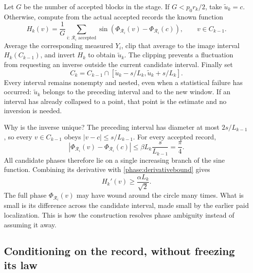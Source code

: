 \documentclass[11pt,a4paper]{article}
\numberwithin{equation}{section}
\theoremstyle{remark}
\begin{document}
Let $G$ be the number of accepted blocks in the stage.  If
$G<p_0r_k/2$, take $\widetilde u_k=c$.  Otherwise, compute from the actual
accepted records the known function
\begin{equation}
 H_k(v)=\frac1G\sum_{i:\,\mathcal R_i\text{ accepted}}
 \sin(\Phi_{\mathcal R_i}(v)-\Phi_{\mathcal R_i}(c)),
 \qquad v\in C_{k-1}.
 \label{phase:responsecurve}
\end{equation}
Average the corresponding measured $Y_i$, clip that average to the image
interval $H_k(C_{k-1})$, and invert $H_k$ to obtain $\widetilde u_k$.  The
clipping prevents a fluctuation from requesting an inverse outside the
current candidate interval.  Finally set
\begin{equation}
 C_k=C_{k-1}\cap
 [\widetilde u_k-s/L_k,\widetilde u_k+s/L_k].
 \label{phase:nesting}
\end{equation}
Every interval remains nonempty and nested, even when a statistical failure
has occurred: $\widetilde u_k$ belongs to the preceding interval and to the
new window.  If an interval has already collapsed to a point, that point is
the estimate and no inversion is needed.

Why is the inverse unique?  The preceding interval has diameter at most
$2s/L_{k-1}$, so every $v\in C_{k-1}$ obeys $|v-c|\le s/L_{k-1}$.
For every accepted record,
\begin{equation}
 |\Phi_{\mathcal R_i}(v)-\Phi_{\mathcal R_i}(c)|
 \le\beta L_k\frac{s}{L_{k-1}}=\frac\pi4.
 \label{phase:noalias}
\end{equation}
All candidate phases therefore lie on a single increasing branch of the
sine function.  Combining its derivative with
\eqref{phase:derivativebound} gives
\begin{equation}
 H_k'(v)\ge\frac{\alpha L_k}{\sqrt2}.
 \label{phase:inversebound}
\end{equation}
The full phase $\Phi_{\mathcal R_i}(v)$ may have wound around the circle many
times.  What is small is its difference across the candidate interval, made
small by the earlier paid localization.  This is how the construction
resolves phase ambiguity instead of assuming it away.

\subsection{Conditioning on the record, without freezing its law}
\label{phase:conditioning}
\end{document}
